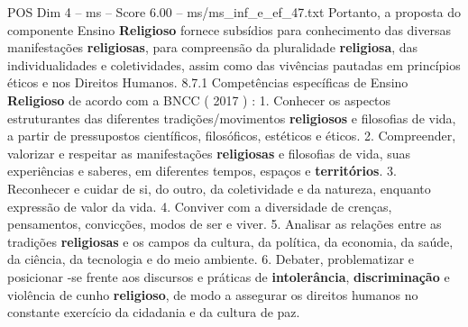 \begin{textsample}{POS Dim 4 – ms – Score 6.00 – ms/ms\_inf\_e\_ef\_47.txt}
Portanto, a proposta do componente Ensino \textbf{Religioso} fornece subsídios para conhecimento das diversas manifestações \textbf{religiosas}, para compreensão da pluralidade \textbf{religiosa}, das individualidades e coletividades, assim como das vivências pautadas em princípios éticos e nos Direitos Humanos. 8.7.1 Competências específicas de Ensino \textbf{Religioso} de acordo com a BNCC ( 2017 ) : 1.
Conhecer os aspectos estruturantes das diferentes tradições/movimentos \textbf{religiosos} e filosofias de vida, a partir de pressupostos científicos, filosóficos, estéticos e éticos. 2.
Compreender, valorizar e respeitar as manifestações \textbf{religiosas} e filosofias de vida, suas experiências e saberes, em diferentes tempos, espaços e \textbf{territórios}. 3.
Reconhecer e cuidar de si, do outro, da coletividade e da natureza, enquanto expressão de valor da vida. 4.
Conviver com a diversidade de crenças, pensamentos, convicções, modos de ser e viver. 5.
Analisar as relações entre as tradições \textbf{religiosas} e os campos da cultura, da política, da economia, da saúde, da ciência, da tecnologia e do meio ambiente. 6.
Debater, problematizar e posicionar -se frente aos discursos e práticas de \textbf{intolerância}, \textbf{discriminação} e violência de cunho \textbf{religioso}, de modo a assegurar os direitos humanos no constante exercício da cidadania e da cultura de paz.

\end{textsample}
